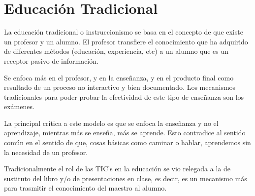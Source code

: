 \section{Educación Tradicional}

La educación tradicional o instruccionismo se basa en el concepto de que existe
un profesor y un alumno. El profesor transfiere el conocimiento que ha adquirido
de diferentes métodos (educación, experiencia, etc) a un alumno que es un
receptor pasivo de información\cite{johnson2005instructionism}.

Se enfoca más en el profesor, y en la enseñanza, y en el producto final como
resultado de un proceso no interactivo y bien
documentado\cite{igi:instructionism}. Los mecanismos tradicionales para poder
probar la efectividad de este tipo de enseñanza son los exámenes.

La principal critica a este modelo es que se enfoca la enseñanza y no el
aprendizaje, mientras más se enseña, más se aprende. Esto contradice al sentido
común en el sentido de que, cosas básicas como caminar o hablar, aprendemos sin
la necesidad de un
profesor\cite{ackoff:education}\cite{johnson2005instructionism}.

Tradicionalmente el rol de las TIC's en la educación se vio relegada a la de
sustituto del libro y/o de presentaciones en clase, es decir, es un mecanismo
más para trasmitir el conocimiento del maestro al alumno.


